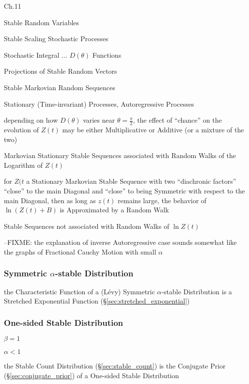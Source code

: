 Ch.11

Stable Random Variables

Stable Scaling Stochastic Processes

Stochastic Integral ... $D(\theta)$ Functions

Projections of Stable Random Vectors

Stable Markovian Random Sequences

Stationary (Time-invariant) Processes, Autoregressive Processes

depending on how $D(\theta)$ varies near $\theta = \frac{\pi}{2}$, the effect of
``chance'' on the evolution of $Z(t)$ may be either Multiplicative or Additive
(or a mixture of the two)

Markovian Stationary Stable Sequences associated with Random Walks of the
Logarithm of $Z(t)$

for $Z(t$ a Stationary Markovian Stable Sequence with two ``diachronic factors''
``close'' to the main Diagonal and ``close'' to being Symmetric with respect to
the main Diagonal, then as long as $z(t)$ remains large, the behavior of
$\ln(Z(t) + B)$ is Approximated by a Random Walk

Stable Sequences not associated with Random Walks of $\ln Z(t)$

--FIXME: the explanation of inverse Autoregressive case sounds somewhat like the
graphs of Fractional Cauchy Motion with small $\alpha$



\subsubsection{Symmetric $\alpha$-stable Distribution}
\label{sec:symmetric_alpha_stable}

the Characteristic Function of a (L\'evy) Symmetric $\alpha$-stable Distribution
is a Stretched Exponential Function (\S\ref{sec:stretched_exponential})



\subsubsection{One-sided Stable Distribution}\label{sec:onesided_stable}

$\beta = 1$

$\alpha < 1$

the Stable Count Distribution (\S\ref{sec:stable_count}) is the Conjugate Prior
(\S\ref{sec:conjugate_prior}) of a One-sided Stable Distribution



